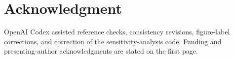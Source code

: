 \section*{Acknowledgment}
OpenAI Codex assisted reference checks, consistency revisions, figure-label corrections, and correction of the sensitivity-analysis code. Funding and presenting-author acknowledgments are stated on the first page.
